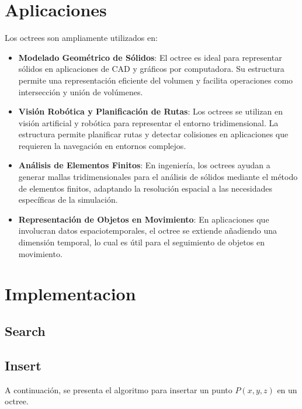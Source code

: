 \documentclass{article}
\begin{document}
\section{Aplicaciones}
Los octrees son ampliamente utilizados en:
\begin{itemize}
    \item \textbf{Modelado Geométrico de Sólidos}: El octree es ideal para representar sólidos en aplicaciones de CAD y gráficos por computadora. Su estructura permite una representación eficiente del volumen y facilita operaciones como intersección y unión de volúmenes.
    \item \textbf{Visión Robótica y Planificación de Rutas}: Los octrees se utilizan en visión artificial y robótica para representar el entorno tridimensional. La estructura permite planificar rutas y detectar colisiones en aplicaciones que requieren la navegación en entornos complejos.
    \item \textbf{Análisis de Elementos Finitos}: En ingeniería, los octrees ayudan a generar mallas tridimensionales para el análisis de sólidos mediante el método de elementos finitos, adaptando la resolución espacial a las necesidades específicas de la simulación.
    \item \textbf{Representación de Objetos en Movimiento}: En aplicaciones que involucran datos espaciotemporales, el octree se extiende añadiendo una dimensión temporal, lo cual es útil para el seguimiento de objetos en movimiento.
\end{itemize}
\section{Implementacion}
\subsection{Search}

\subsection{Insert}
A continuación, se presenta el algoritmo para insertar un punto \(P(x, y, z)\) en un octree. 
\end{document}
